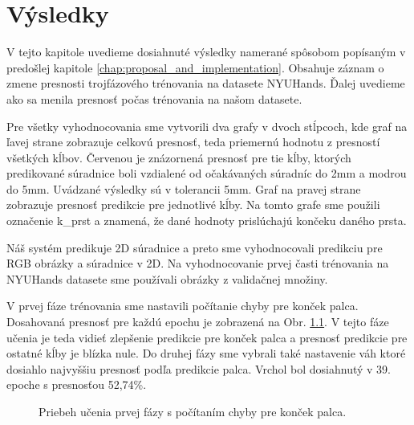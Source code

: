 \chapter{Výsledky}\label{chap:results}

V tejto kapitole uvedieme dosiahnuté výsledky namerané spôsobom popísaným v predošlej kapitole \ref{chap:proposal_and_implementation}. Obsahuje záznam o zmene presnosti trojfázového trénovania na datasete NYUHands. Ďalej uvedieme ako sa menila presnosť počas trénovania na našom datasete.%

Pre všetky vyhodnocovania sme vytvorili dva grafy v dvoch stĺpcoch, kde graf na ľavej strane zobrazuje celkovú presnosť, teda priemernú hodnotu z presností všetkých kĺbov. Červenou je znázornená presnosť pre tie kĺby, ktorých predikované súradnice boli vzdialené od očakávaných súradníc do 2mm a modrou do 5mm. Uvádzané výsledky sú v tolerancii 5mm. Graf na pravej strane zobrazuje presnosť predikcie pre jednotlivé kĺby. Na tomto grafe sme použili označenie k\_prst a znamená, že dané hodnoty prislúchajú končeku daného prsta.

Náš systém predikuje 2D súradnice a preto sme vyhodnocovali predikciu pre RGB obrázky a súradnice v 2D. Na vyhodnocovanie prvej časti trénovania na NYUHands datasete sme používali obrázky z validačnej množiny.%

V prvej fáze trénovania sme nastavili počítanie chyby pre konček palca. Dosahovaná presnosť pre každú epochu je zobrazená na Obr. \ref{img:50thumbAcc}.  V tejto fáze učenia je teda vidieť zlepšenie predikcie pre konček palca a presnosť predikcie pre ostatné kĺby je blízka nule. Do druhej fázy sme vybrali také nastavenie váh ktoré dosiahlo najvyššiu presnosť podľa predikcie palca. Vrchol bol dosiahnutý v 39. epoche s presnosťou 52,74\%.

\begin{figure}[H]
	\begin{center}
		\caption{Priebeh učenia prvej fázy s počítaním chyby pre konček palca.}
		\label{img:50thumbAcc}
	\end{center}
\end{figure}

